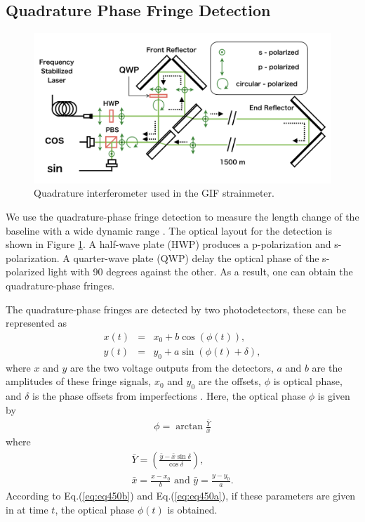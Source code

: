 \subsection{Quadrature Phase Fringe Detection} \label{sec:141}
\begin{figure}[h]
  \begin{center}
    \includegraphics[width=13.0cm]{./img_chap4/img413.png}
    \caption{Quadrature interferometer used in the GIF strainmeter.}\label{img:img413}
  \end{center}
\end{figure}
We use the quadrature-phase fringe detection to measure the length change of the baseline with a wide dynamic range \cite{bobroff1993recent}. The optical layout for the detection is shown in Figure  \ref{img:img413}. A half-wave plate (HWP) produces a p-polarization and s-polarization. A quarter-wave plate (QWP) delay the optical phase of the s-polarized light with 90 degrees against the other. As a result, one can obtain the quadrature-phase fringes.

The quadrature-phase fringes are detected by two photodetectors, these can be represented as 
\begin{eqnarray}
  x(t) &=& x_0 + b \cos(\phi(t)), \label{eq:eq450b} \\
  y(t) &=& y_0 + a \sin(\phi(t)+\delta), \label{eq:eq450a}  
\end{eqnarray}
where $x$ and $y$ are the two voltage outputs from the detectors, $a$ and $b$ are the amplitudes of these fringe signals, $x_0$ and $y_0$ are the offsets, $\phi$ is optical phase, and $\delta$ is the phase offsets from imperfections \cite{zumberge2004resolving}. Here, the optical phase $\phi$ is given by
\begin{eqnarray}
  \phi = \arctan {\frac{\bar{Y}}{\bar{x}}} \label{eq:eq440c}
\end{eqnarray}
where 
\begin{eqnarray}\label{eq:eq440a} 
  \bar{Y} = \left(\frac{\bar{y}-\bar{x}\sin{\delta}}{\cos{\delta}}\right), \\
  \bar{x} = \frac{x-x_0}{b}\,\,\mathrm{and}\,\,\bar{y} = \frac{y-y_0}{a}. \label{eq:eq440b}
\end{eqnarray}
According to Eq.(\ref{eq:eq450b}) and Eq.(\ref{eq:eq450a}), if these parameters are given in at time $t$, the optical phase $\phi(t)$ is obtained.


